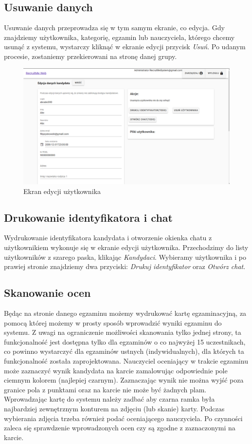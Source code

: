 \documentclass{article}
\begin{document}
\subsection{Usuwanie danych}
Usuwanie danych przeprowadza się w tym samym ekranie, co edycja. Gdy znajdziemy użytkownika, kategorię, egzamin lub nauczyciela, którego chcemy usunąć z systemu, wystarczy kliknąć w ekranie edycji przycisk \emph{Usuń}. Po udanym procesie, zostaniemy przekierowani na stronę danej grupy.
\begin{figure}[H]
    \centering
    \includegraphics[width=1\linewidth]{images/web/ap_edit.png}
    \caption{Ekran edycji użytkownika}
    \label{fig:test3_label}
\end{figure}

\subsection{Drukowanie identyfikatora i chat}
Wydrukowanie identyfikatora kandydata i otworzenie okienka chatu z użytkownikiem wykonuje się w ekranie edycji użytkownika. Przechodzimy do listy użytkowników z szarego paska, klikając \emph{Kandydaci}. Wybieramy użytkownika i po prawiej stronie znajdziemy dwa przyciski: \emph{Drukuj identyfikator} oraz \emph{Otwórz chat}.

\subsection{Skanowanie ocen}
Będąc na stronie danego egzaminu możemy wydrukować kartę egzaminacyjną, za pomocą której możemy w prosty sposób wprowadzić wyniki egzaminu do systemu. Z uwagi na ograniczenie możliwości skanowania tylko jednej strony, ta funkcjonalność jest dostępna tylko dla egzaminów o co najwyżej 15 uczestnikach, co powinno wystarczyć dla egzaminów ustnych (indywidualnych), dla których ta funkcjonalność została zaprojektowana. Nauczyciel oceniający w trakcie egzaminu może zaznaczyć wynik kandydata na karcie zamalowując odpowiednie pole ciemnym kolorem (najlepiej czarnym). Zaznaczając wynik nie można wyjść poza granice pola z punktami oraz na karcie nie może być żadnych plam. Wprowadzając kartę do systemu należy zadbać aby czarna ramka była najbardziej zewnętrznym konturem na zdjęciu (lub skanie) karty. Podczas wybierania zdjęcia trzeba również podać oceniającego nauczyciela. Po czynności zaleca się sprawdzenie wprowadzonych ocen czy są zgodne z zaznaczonymi na karcie. 
\end{document}
